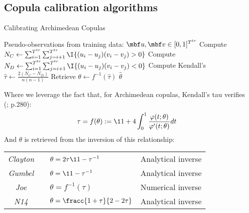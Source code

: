 

\subsection{Copula calibration algorithms}

\begin{algorithm}[H]
\label{alg:calibrating_archimedean}
\caption{Calibrating Archimedean Copulas}
\begin{algorithmic}[1]
\Require Pseudo-observations from training data: $\mbf u,\mbf v\in [0,1]^{T^{tr}}$
\State Compute $N_C \gets \sum_{i=1}^{T^{tr}}\sum_{j=i+1}^{T^{tr}} \I{(u_i-u_j)(v_i-v_j) > 0}$
\State Compute $N_D \gets \sum_{i=1}^{T^{tr}}\sum_{j=i+1}^{T^{tr}} \I{(u_i-u_j)(v_i-v_j) < 0}$
\State Compute Kendall's $\displaystyle \hat \tau \gets \frac{2(N_C-N_D)}{n(n-1)}$
\State Retrieve $\hat \theta \gets f^{-1}(\hat \tau)$
\Ensure $\hat \theta $
\end{algorithmic}
\end{algorithm}

Where we leverage the fact that, for Archimedean copulas, Kendall's tau verifies (\cite{alexander2008market}; p.280):
$$
\tau 
= f(\theta):=
\1{1+4 \int_{0}^{1} \frac{\varphi(t;\theta)}{\varphi'(t;\theta)}dt}
$$
And $\theta$ is retrieved from the inversion of this relationship:

\vspace{0.2cm}
{\centering
\renewcommand{\arraystretch}{1.4}  
\begin{tabular}{ccll}
\textit{Clayton} && 
$\displaystyle 
\theta = {2\tau}\1{1-\tau}^{-1}
$ 
& Analytical inverse
\\
\textit{Gumbel} && 
$\displaystyle 
\theta = \1{1-\tau}^{-1}
$ 
& Analytical inverse
\\
\textit{Joe} && 
$\displaystyle 
\theta = f^{-1}(\tau) 
$
& Numerical inverse
\\
\textit{N14} && 
$\displaystyle
\theta = \fracc{1+\tau}{2-2\tau}
$
& Analytical inverse
\\
\end{tabular}
\par}


